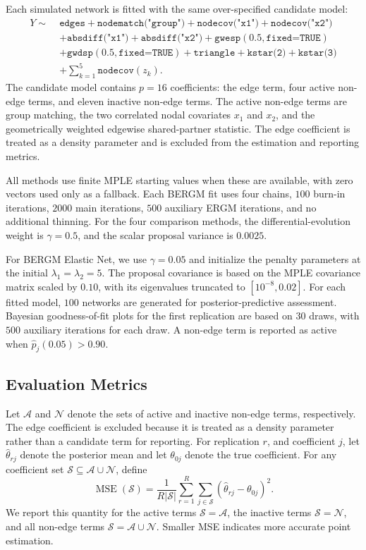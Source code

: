 \documentclass[preprint,12pt,authoryear]{elsarticle}
\begin{document}
Each simulated network is fitted with the same over-specified candidate model:
\[
\begin{aligned}
Y\sim\;&
\texttt{edges}+\texttt{nodematch("group")}
+\texttt{nodecov("x1")}+\texttt{nodecov("x2")}\\
&+\texttt{absdiff("x1")}+\texttt{absdiff("x2")}
+\texttt{gwesp}(0.5,\texttt{fixed=TRUE})\\
&+\texttt{gwdsp}(0.5,\texttt{fixed=TRUE})
+\texttt{triangle}+\texttt{kstar(2)}+\texttt{kstar(3)}\\
&+\sum_{k=1}^{5}\texttt{nodecov}(z_k).
\end{aligned}
\]
The candidate model contains \(p=16\) coefficients: the edge term, four active
non-edge terms, and eleven inactive non-edge terms. The active non-edge terms
are group matching, the two correlated nodal covariates \(x_1\) and \(x_2\),
and the geometrically weighted edgewise shared-partner statistic. The edge
coefficient is treated as a density parameter and is excluded from the
estimation and reporting metrics.

All methods use finite MPLE starting values when these are available, with zero
vectors used only as a fallback. Each BERGM fit uses four chains, \(100\)
burn-in iterations, \(2000\) main iterations, \(500\) auxiliary ERGM
iterations, and no additional thinning. For the four comparison methods, the
differential-evolution weight is \(\gamma=0.5\), and the scalar proposal
variance is \(0.0025\).

For BERGM Elastic Net, we use \(\gamma=0.05\) and initialize the penalty
parameters at the initial $
\lambda_1=\lambda_2=5.
$
The proposal covariance is based on the MPLE covariance matrix scaled by
\(0.10\), with its eigenvalues truncated to $
[10^{-8},0.02].
$ For each fitted model, \(100\) networks are generated for
posterior-predictive assessment. Bayesian goodness-of-fit plots for the first
replication are based on \(30\) draws, with \(500\) auxiliary
iterations for each draw. A non-edge term is reported as active when
$
\widehat p_j(0.05)>0.90.
$
\subsection{Evaluation Metrics}

Let \(\mathcal A\) and \(\mathcal N\) denote the sets of active and inactive
non-edge terms, respectively. The edge coefficient is excluded because it is
treated as a density parameter rather than a candidate term for reporting.
For replication \(r\), and coefficient \(j\), let
\(\widehat\theta_{rj}\) denote the posterior mean and let
\(\theta_{0j}\) denote the true coefficient. For any coefficient set
\(\mathcal S\subseteq\mathcal A\cup\mathcal N\), define
\[
\operatorname{MSE}(\mathcal S)
=
\frac{1}{R|\mathcal S|}
\sum_{r=1}^{R}\sum_{j\in\mathcal S}
\left(\widehat\theta_{rj}-\theta_{0j}\right)^2.
\]
We report this quantity for the active terms
\(\mathcal S=\mathcal A\), the inactive terms
\(\mathcal S=\mathcal N\), and all non-edge terms
\(\mathcal S=\mathcal A\cup\mathcal N\). Smaller MSE indicates more accurate
point estimation.
\end{document}
